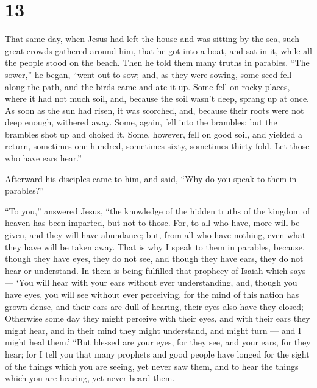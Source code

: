 \hypertarget{section-12}{%
\section{13}\label{section-12}}

 That same day, when Jesus had left the house and was
sitting by the sea,  such great crowds gathered around him,
that he got into a boat, and sat in it, while all the people stood on
the beach.  Then he told them many truths in parables. ``The
sower,'' he began, ``went out to sow; and,  as they were
sowing, some seed fell along the path, and the birds came and ate it up.
 Some fell on rocky places, where it had not much soil, and,
because the soil wasn't deep, sprang up at once.  As soon as
the sun had risen, it was scorched, and, because their roots were not
deep enough, withered away.  Some, again, fell into the
brambles; but the brambles shot up and choked it.  Some,
however, fell on good soil, and yielded a return, sometimes one hundred,
sometimes sixty, sometimes thirty fold.  Let those who have
ears hear.''

 Afterward his disciples came to him, and said, ``Why do
you speak to them in parables?''

 ``To you,'' answered Jesus, ``the knowledge of the hidden
truths of the kingdom of heaven has been imparted, but not to those.
 For, to all who have, more will be given, and they will
have abundance; but, from all who have nothing, even what they have will
be taken away.  That is why I speak to them in parables,
because, though they have eyes, they do not see, and though they have
ears, they do not hear or understand.  In them is being
fulfilled that prophecy of Isaiah which says --- `You will hear with
your ears without ever understanding, and, though you have eyes, you
will see without ever perceiving,  for the mind of this
nation has grown dense, and their ears are dull of hearing, their eyes
also have they closed; Otherwise some day they might perceive with their
eyes, and with their ears they might hear, and in their mind they might
understand, and might turn --- and I might heal them.' 
``But blessed are your eyes, for they see, and your ears, for they hear;
 for I tell you that many prophets and good people have
longed for the sight of the things which you are seeing, yet never saw
them, and to hear the things which you are hearing, yet never heard
them.

